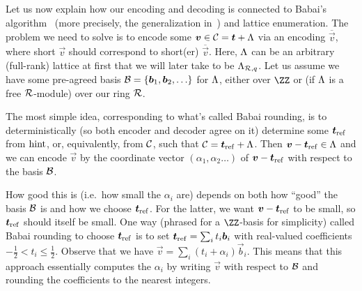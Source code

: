\begin{remark}\label{rmk:RelationshipToBabai}
Let us now explain how our encoding and decoding is connected to Babai's algorithm~\cite{DBLP:journals/combinatorica/Babai86} (more precisely, the generalization in~\cite{RSA:LinPei11}) and lattice enumeration.
The problem we need to solve is to encode some $\boldsymbol{v}\in\mathcal{C} = \boldsymbol{t} + \Lambda$ via an encoding $\overline{\vec{v}}$, where short $\vec{v}$ should correspond to short(er) $\overline{\vec{v}}$. Here, $\Lambda$ can be an arbitrary (full-rank) lattice at first that we will later take to be $\Lambda_{\mathcal{R},q}$. Let us assume we have some pre-agreed basis $\mathcal{B} = \{\boldsymbol{b}_1,\boldsymbol{b}_2,\ldots\}$ for $\Lambda$, either over $\ZZ$ or (if $\Lambda$ is a free $\mathcal{R}$-module) over our ring $\mathcal{R}$.

The most simple idea, corresponding to what's called Babai rounding, is to deterministically (so both encoder and decoder agree on it) determine some $\boldsymbol{t}_{\mathrm{ref}}$ from $\mathrm{hint}$, or, equivalently, from $\mathcal{C}$, such that $\mathcal{C} = \boldsymbol{t}_{\mathrm{ref}} + \Lambda$. Then $\boldsymbol{v} - \boldsymbol{t}_{\mathrm{ref}} \in \Lambda$ and we can encode $\vec{v}$ by the coordinate vector $(\alpha_1,\alpha_2\ldots)$ of $\boldsymbol{v}-\boldsymbol{t}_{\mathrm{ref}}$ with respect to the basis $\mathcal{B}$.

How good this is (i.e.\ how small the $\alpha_i$ are) depends on both how ``good'' the basis $\mathcal{B}$ is and how we choose $\boldsymbol{t}_{\mathrm{ref}}$. For the latter, we want $\boldsymbol{v}-\boldsymbol{t}_{\mathrm{ref}}$ to be small, so $\boldsymbol{t}_{\mathrm{ref}}$ should itself be small. One way (phrased for a $\ZZ$-basis for simplicity) called Babai rounding to choose $\boldsymbol{t}_{\mathrm{ref}}$ is to set $\boldsymbol{t}_{\mathrm{ref}} = \sum_i  t_i\boldsymbol{b}_i$ with real-valued coefficients $-\tfrac12 < t_i \leq \tfrac12$. Observe that we have $\vec{v} = \sum_i (t_i + \alpha_i)\vec{b}_i$.
This means that this approach essentially computes the $\alpha_i$ by writing $\vec{v}$ with respect to $\mathcal{B}$ and rounding the coefficients to the nearest integers.


\end{remark}
